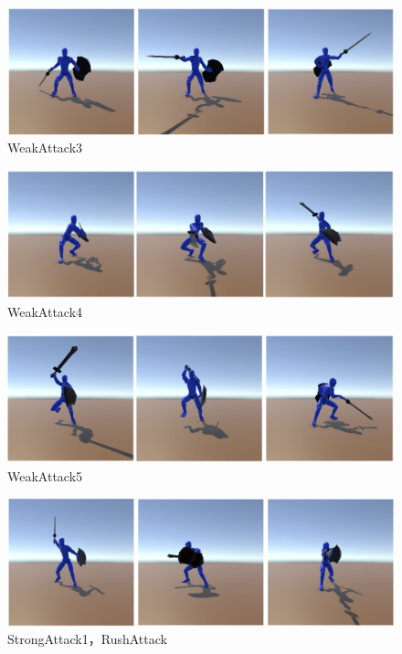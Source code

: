 \documentclass[a4paper,12pt,oneside,openany,titlepage]{jreport}
\begin{document}
\begin{figure}[h]
  \begin{center}
    \includegraphics[width=13cm]{FrameImage/Attack3.png}
    \caption{WeakAttack3}
    \label{}
  \end{center}
\end{figure}
\begin{figure}[h]
  \begin{center}
    \includegraphics[width=13cm]{FrameImage/Attack4.png}
    \caption{WeakAttack4}
    \label{}
  \end{center}
\end{figure}
\begin{figure}[h]
  \begin{center}
    \includegraphics[width=13cm]{FrameImage/Attack5.png}
    \caption{WeakAttack5}
    \label{}
  \end{center}
\end{figure}
\begin{figure}[h]
  \begin{center}
    \includegraphics[width=13cm]{FrameImage/SuddenApproach.png}
    \caption{StrongAttack1，RushAttack}
    \label{}
  \end{center}
\end{figure}
\end{document}
